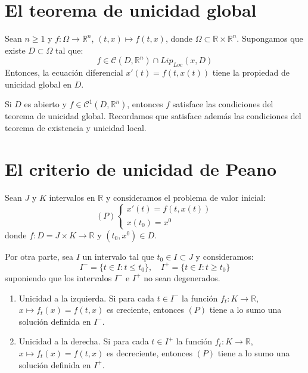 \section{El teorema de unicidad global}
\begin{theorem}
    Sean $n \geq 1$ y $f: \Omega \to \mathbb{R}^n$, $(t, x) \mapsto f(t, x)$, donde $\Omega \subset \mathbb{R} \times \mathbb{R}^n$.
    Supongamos que existe $D \subset \Omega$ tal que:
    $$f \in \mathcal{C}(D, \mathbb{R}^n) \cap Lip_{Loc}(x, D)$$
    Entonces, la ecuación diferencial $x'(t) = f(t, x(t))$ tiene la propiedad de unicidad global en $D$.
\end{theorem}

\begin{remark}
    Si $D$ es abierto y $f \in \mathcal{C}^1(D, \mathbb{R}^n)$, entonces $f$ satisface las condiciones del teorema de unicidad global.
    Recordamos que satisface además las condiciones del teorema de existencia y unicidad local.
\end{remark}

\section{El criterio de unicidad de Peano}
\begin{proposition}
    Sean $J$ y $K$ intervalos en $\mathbb{R}$ y consideramos el problema de valor inicial:
    $$(P) \begin{cases}
            x'(t) = f(t, x(t)) \\
            x(t_0) = x^0
        \end{cases}$$
    donde $f: D = J \times K \to \mathbb{R}$ y $(t_0, x^0) \in D$.

    Por otra parte, sea $I$ un intervalo tal que $t_0 \in I \subset J$ y consideramos:
    $$I^- = \{t \in I: t \leq t_0\}, \quad I^+ = \{t \in I: t \geq t_0\}$$
    suponiendo que los intervalos $I^-$ e $I^+$ no sean degenerados.
    \begin{enumerate}
        \item Unicidad a la izquierda. Si para cada $t \in I^-$ la función $f_t: K \to \mathbb{R}$, $x \mapsto f_t(x) = f(t, x)$ es creciente, entonces $(P)$ tiene a lo sumo una solución definida en $I^-$.
        \item Unicidad a la derecha. Si para cada $t \in I^+$ la función $f_t: K \to \mathbb{R}$, $x \mapsto f_t(x) = f(t, x)$ es decreciente, entonces $(P)$ tiene a lo sumo una solución definida en $I^+$.
    \end{enumerate}
\end{proposition}


